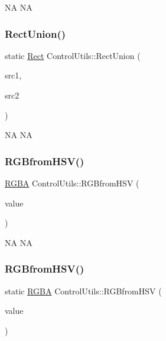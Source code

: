 NA  NA \mbox{\label{classControlUtils_a29002cf54d0420fd910c30b72f5de74e}} 
\subsubsection{\texorpdfstring{Rect\+Union()}{RectUnion()}\hspace{0.1cm}{\footnotesize\ttfamily [2/2]}}
{\footnotesize\ttfamily static \hyperlink{classRect}{Rect} Control\+Utils\+::\+Rect\+Union (\begin{DoxyParamCaption}\item[{const \hyperlink{classRect}{Rect} \&}]{src1,  }\item[{const \hyperlink{classRect}{Rect} \&}]{src2 }\end{DoxyParamCaption})\hspace{0.3cm}{\ttfamily [static]}}

NA  NA \mbox{\label{classControlUtils_a9e4144faea346e5e563fb7a2116ac69b}} 
\subsubsection{\texorpdfstring{R\+G\+Bfrom\+H\+S\+V()}{RGBfromHSV()}\hspace{0.1cm}{\footnotesize\ttfamily [1/2]}}
{\footnotesize\ttfamily \hyperlink{structRGBA}{R\+G\+BA} Control\+Utils\+::\+R\+G\+Bfrom\+H\+SV (\begin{DoxyParamCaption}\item[{\hyperlink{structHSV}{H\+SV}}]{value }\end{DoxyParamCaption})\hspace{0.3cm}{\ttfamily [static]}}

NA  NA \mbox{\label{classControlUtils_a3ac328998242b244102f7904203d795e}} 
\subsubsection{\texorpdfstring{R\+G\+Bfrom\+H\+S\+V()}{RGBfromHSV()}\hspace{0.1cm}{\footnotesize\ttfamily [2/2]}}
{\footnotesize\ttfamily static \hyperlink{structRGBA}{R\+G\+BA} Control\+Utils\+::\+R\+G\+Bfrom\+H\+SV (\begin{DoxyParamCaption}\item[{\hyperlink{structHSV}{H\+SV}}]{value }\end{DoxyParamCaption})\hspace{0.3cm}{\ttfamily [static]}}

